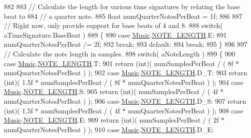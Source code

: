 \begin{DoxyCodeInclude}
882 
883         \textcolor{comment}{// Calculate the length for various time signatures by relating the base beat to }
884         \textcolor{comment}{// a quarter note. }
885         \textcolor{keywordtype}{float} numQuarterNotesPerBeat = 1f;
886 
887         \textcolor{comment}{// Right now, only provide support for base beats of 4 and 8.}
888         \textcolor{keywordflow}{switch}( aTimeSignature.BaseBeat )
889         \{
890             \textcolor{keywordflow}{case} \hyperlink{class_music}{Music}.\hyperlink{group___music_enums_gaf11b5f079adbb21c800b9eca1c5c3cbd}{NOTE\_LENGTH}.E:
891                 numQuarterNotesPerBeat /= 2f;
892                 \textcolor{keywordflow}{break};
893             \textcolor{keywordflow}{default}:
894                 \textcolor{keywordflow}{break};
895         \}
896 
897         \textcolor{comment}{// Calculate the note length in samples.}
898         \textcolor{keywordflow}{switch}( aNoteLength )
899         \{
900             \textcolor{keywordflow}{case} \hyperlink{class_music}{Music}.\hyperlink{group___music_enums_gaf11b5f079adbb21c800b9eca1c5c3cbd}{NOTE\_LENGTH}.T:
901                 \textcolor{keywordflow}{return} (\textcolor{keywordtype}{int})( numSamplesPerBeat / ( 8f * numQuarterNotesPerBeat ) );
902             \textcolor{keywordflow}{case} \hyperlink{class_music}{Music}.\hyperlink{group___music_enums_gaf11b5f079adbb21c800b9eca1c5c3cbd}{NOTE\_LENGTH}.D\_T:
903                 \textcolor{keywordflow}{return} (\textcolor{keywordtype}{int})( 1.5f * numSamplesPerBeat / ( 8f * numQuarterNotesPerBeat ) );
904             \textcolor{keywordflow}{case} \hyperlink{class_music}{Music}.\hyperlink{group___music_enums_gaf11b5f079adbb21c800b9eca1c5c3cbd}{NOTE\_LENGTH}.S:
905                 \textcolor{keywordflow}{return} (\textcolor{keywordtype}{int})( numSamplesPerBeat / ( 4f * numQuarterNotesPerBeat ) );
906             \textcolor{keywordflow}{case} \hyperlink{class_music}{Music}.\hyperlink{group___music_enums_gaf11b5f079adbb21c800b9eca1c5c3cbd}{NOTE\_LENGTH}.D\_S:
907                 \textcolor{keywordflow}{return} (\textcolor{keywordtype}{int})( 1.5f * numSamplesPerBeat / ( 4f * numQuarterNotesPerBeat ) );
908             \textcolor{keywordflow}{case} \hyperlink{class_music}{Music}.\hyperlink{group___music_enums_gaf11b5f079adbb21c800b9eca1c5c3cbd}{NOTE\_LENGTH}.E:
909                 \textcolor{keywordflow}{return} (\textcolor{keywordtype}{int})( numSamplesPerBeat / ( 2f * numQuarterNotesPerBeat ) );
910             \textcolor{keywordflow}{case} \hyperlink{class_music}{Music}.\hyperlink{group___music_enums_gaf11b5f079adbb21c800b9eca1c5c3cbd}{NOTE\_LENGTH}.D\_E:

\end{DoxyCodeInclude}
